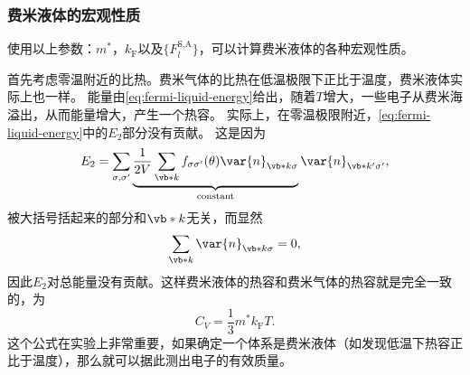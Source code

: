 \subsubsection{费米液体的宏观性质}

使用以上参数：$m^*$，$k_\text{F}$以及$\{F_l^\text{S,A}\}$，可以计算费米液体的各种宏观性质。

首先考虑零温附近的比热。费米气体的比热在低温极限下正比于温度，费米液体实际上也一样。
能量由\eqref{eq:fermi-liquid-energy}给出，随着$T$增大，一些电子从费米海溢出，从而能量增大，产生一个热容。
实际上，在零温极限附近，\eqref{eq:fermi-liquid-energy}中的$E_2$部分没有贡献。
这是因为
\[
    E_2 = \sum_{\sigma, \sigma'} \underbrace{\frac{1}{2V} \sum_{\vb*{k}} f_{\sigma \sigma'}(\theta) \var{n}_{\vb*{k} \sigma}}_{\text{constant}} \var{n}_{\vb*{k}' \sigma'},
\]
被大括号括起来的部分和$\vb*{k}$无关，而显然
\[
    \sum_{\vb*{k}} \var{n}_{\vb*{k} \sigma} = 0,
\]
因此$E_2$对总能量没有贡献。这样费米液体的热容和费米气体的热容就是完全一致的，为
\begin{equation}
    C_V = \frac{1}{3} m^* k_\text{F} T.
\end{equation}
这个公式在实验上非常重要，如果确定一个体系是费米液体（如发现低温下热容正比于温度），那么就可以据此测出电子的有效质量。

